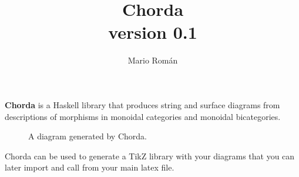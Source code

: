 \documentclass{article}
\title{Chorda \\ \normalsize{\textsf{version 0.1}}}
\author{Mario Román}
\begin{document}
\maketitle

\textbf{Chorda} is a Haskell library that produces string and surface diagrams from descriptions of morphisms in monoidal categories and monoidal bicategories.
\begin{figure}[h]
  \centering
  \assocDiagram
  \caption{A diagram generated by Chorda.}
\end{figure}

Chorda can be used to generate a TikZ library with your diagrams that you can later import and call from your main latex file.
\end{document}
